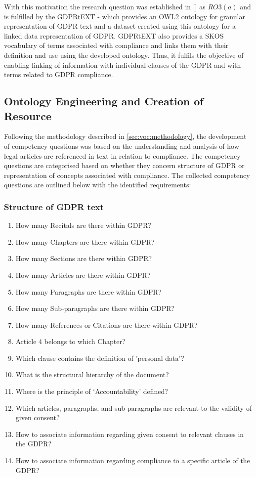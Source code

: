 With this motivation the research question was established in \autoref{} as $RO3(a)$ and is fulfilled by the GDPRtEXT - which provides an OWL2 ontology for granular representation of GDPR text and a dataset created using this ontology for a linked data representation of GDPR. GDPRtEXT also provides a SKOS vocabulary of terms associated with compliance and links them with their definition and use using the developed ontology. Thus, it fulfils the objective of enabling linking of information with individual clauses of the GDPR and with terms related to GDPR compliance.

\subsection{Ontology Engineering and Creation of Resource}\label{sec:voc:gdprtext-engineering}
Following the methodology described in \autoref{sec:voc:methodology}, the development of competency questions was based on the understanding and analysis of how legal articles are referenced in text in relation to compliance. The competency questions are categorised based on whether they concern structure of GDPR or representation of concepts associated with compliance. The collected competency questions are outlined below with the identified requirements:

\subsubsection{Structure of GDPR text}
\begin{enumerate}[label={\texttt{CQ.\theenumi}}]
    \item How many Recitals are there within GDPR?
    \item How many Chapters are there within GDPR?
    \item How many Sections are there within GDPR?
    \item How many Articles are there within GDPR?
    \item How many Paragraphs are there within GDPR?
    \item How many Sub-paragraphs are there within GDPR?
    \item How many References or Citations are there within GDPR?
    \item Article 4 belongs to which Chapter?
    \item Which clause contains the definition of 'personal data'?
    \item What is the structural hierarchy of the document?
    \item Where is the principle of `Accountability' defined?
    \item Which articles, paragraphs, and sub-paragraphs are relevant to the validity of given consent?
    \item How to associate information regarding given consent to relevant clauses in the GDPR?
    \item How to associate information regarding compliance to a specific article of the GDPR?
\end{enumerate}

